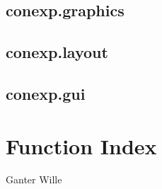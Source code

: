 \documentclass{scrbook}
\begin{document}
  \section{conexp.graphics}

  \section{conexp.layout}

  \section{conexp.gui}


\chapter{Function Index}


\appendix

\begin{thebibliography}{xxxxxxx}
   Ganter Wille
\end{thebibliography}
\end{document}
